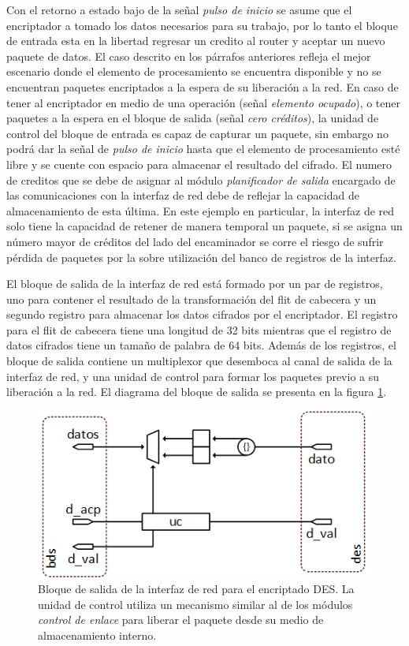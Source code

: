 Con el retorno a estado bajo de la señal \textit{pulso de inicio} se asume que el encriptador a tomado los datos necesarios para su trabajo, por lo tanto el bloque de entrada esta en la libertad regresar un credito al router y aceptar un nuevo paquete de datos. El caso descrito en los párrafos anteriores refleja el mejor escenario donde el elemento de procesamiento se encuentra disponible y no se encuentran paquetes encriptados a la espera de su liberación a la red. En caso de tener al encriptador en medio de una operación (señal \textit{elemento ocupado}), o tener paquetes a la espera en el bloque de salida (señal \textit{cero créditos}), la unidad de control del bloque de entrada es capaz de capturar un paquete, sin embargo no podrá dar la señal de \textit{pulso de inicio} hasta que el elemento de procesamiento esté libre y se cuente con espacio para almacenar el resultado del cifrado. El numero de creditos que se debe de asignar al módulo \textit{planificador de salida} encargado de las comunicaciones con la interfaz de red debe de reflejar la capacidad de almacenamiento de esta última. En este ejemplo en particular, la interfaz de red solo tiene la capacidad de retener de manera temporal un paquete, si se asigna un número mayor de créditos del lado del encaminador se corre el riesgo de sufrir pérdida de paquetes por la sobre utilización del banco de registros de la interfaz.


El bloque de salida de la interfaz de red está formado por un par de registros, uno para contener el resultado de la transformación del flit de cabecera y un segundo registro para almacenar los datos cifrados por el encriptador. El registro para el flit de cabecera tiene una longitud de 32 bits mientras que el registro de datos cifrados tiene un tamaño de palabra de 64 bits. Además de los registros, el bloque de salida contiene un multiplexor que desemboca al canal de salida de la interfaz de red, y una unidad de control para formar los paquetes previo a su liberación a la red. El diagrama del bloque de salida se presenta en la figura \ref{fig:ch4_bloque_salida_des}.

\begin{figure}
	\begin{center}
		\includegraphics[scale=0.7]{figures/ch4_bloque_salida_des.png}
	\end{center}
	\caption
		{	
			Bloque de salida de la interfaz de red para el encriptado DES. La unidad de control utiliza un mecanismo similar al de los módulos \textit{control de enlace} para liberar el paquete desde su medio de almacenamiento interno.
		}
	\label{fig:ch4_bloque_salida_des}
\end{figure}

